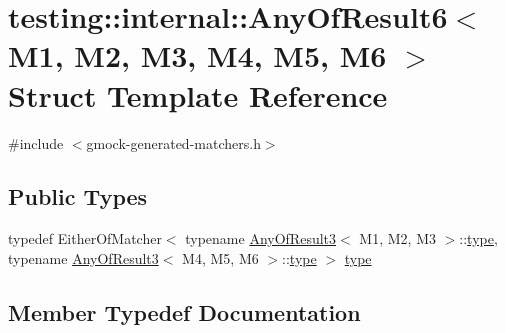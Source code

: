 \hypertarget{structtesting_1_1internal_1_1AnyOfResult6}{}\section{testing\+::internal\+::Any\+Of\+Result6$<$ M1, M2, M3, M4, M5, M6 $>$ Struct Template Reference}
\label{structtesting_1_1internal_1_1AnyOfResult6}


{\ttfamily \#include $<$gmock-\/generated-\/matchers.\+h$>$}

\subsection*{Public Types}
\begin{DoxyCompactItemize}
\item 
typedef Either\+Of\+Matcher$<$ typename \mbox{\hyperlink{structtesting_1_1internal_1_1AnyOfResult3}{Any\+Of\+Result3}}$<$ M1, M2, M3 $>$\+::\mbox{\hyperlink{structtesting_1_1internal_1_1AnyOfResult6_a15837eb05d9ac5a76c20d344a4988dd1}{type}}, typename \mbox{\hyperlink{structtesting_1_1internal_1_1AnyOfResult3}{Any\+Of\+Result3}}$<$ M4, M5, M6 $>$\+::\mbox{\hyperlink{structtesting_1_1internal_1_1AnyOfResult6_a15837eb05d9ac5a76c20d344a4988dd1}{type}} $>$ \mbox{\hyperlink{structtesting_1_1internal_1_1AnyOfResult6_a15837eb05d9ac5a76c20d344a4988dd1}{type}}
\end{DoxyCompactItemize}


\subsection{Member Typedef Documentation}
\mbox{\label{structtesting_1_1internal_1_1AnyOfResult6_a15837eb05d9ac5a76c20d344a4988dd1}} 
